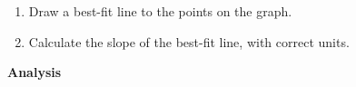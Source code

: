 \documentclass[]{exam}
\begin{document}
\begin{enumerate}[itemsep=0pt,topsep=2pt]
\item Draw a best-fit line to the points on the graph.

\item Calculate the slope of the best-fit line, with correct units.
\vspace{-1ex}

\begin{center}
\end{center}
\end{enumerate}

\clearpage

{\noindent \bfseries Analysis}
\end{document}
